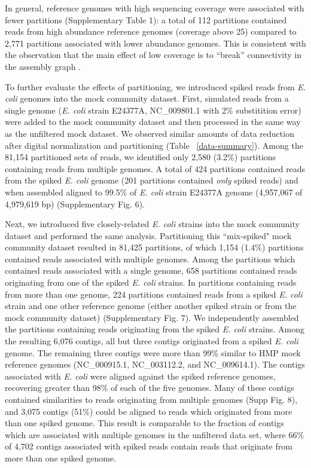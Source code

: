 \documentclass{nature}%
\begin{document}
In general, reference genomes with high sequencing coverage were
associated with fewer partitions (Supplementary Table 1): a
total of 112 partitions contained reads from high abundance reference
genomes (coverage above 25) compared to 2,771 partitions associated
with lower abundance genomes.  This is consistent
with the observation that the main effect of low coverage is to
``break'' connectivity in the assembly graph \cite{Chaisson:2008p1373,Pevzner:2001p1374}.

To further evaluate the effects of partitioning, we introduced spiked reads from
\emph{E. coli} genomes into the mock community
dataset. First, simulated reads from a single genome (\emph{E. coli} strain
E24377A, NC\_009801.1 with 2\% substitition error) were added to the
mock community dataset and then processed in the same way as the
unfiltered mock dataset.  We observed similar amounts of data
reduction after digital normalization and partitioning (Table
~\ref{data-summary}).  Among the 81,154 partitioned sets of reads, we
identified only 2,580 (3.2\%) partitions containing reads from
multiple genomes.  A total of 424 partitions contained reads from the
spiked \emph{E. coli} genome (201 partitions contained \emph{only}
spiked reads) and when assembled aligned to 99.5\% of \emph{E. coli}
strain E24377A genome (4,957,067 of 4,979,619 bp) (Supplementary Fig. 6).

Next, we introduced five closely-related \emph{E. coli} strains into the mock
community dataset and performed the same analysis.
Partitioning this ``mix-spiked" mock community
dataset resulted in 81,425 partitions, of which 1,154 (1.4\%)
partitions contained reads associated with multiple genomes.  Among
the partitions which contained reads associated with a single genome,
658 partitions contained reads originating from one of the spiked
\emph{E. coli} strains.  In partitions containing reads from more than
one genome, 224 partitions contained reads from a spiked
\emph{E. coli} strain and one other reference genome (either another
spiked strain or from the mock community dataset) (Supplementary Fig. 7).  We
independently assembled the partitions containing reads originating
from the spiked \emph{E. coli} strains.  Among the resulting 6,076
contigs, all but three contigs originated from a spiked \emph{E. coli}
genome.  The remaining three contigs were more than 99\% similar to
HMP mock reference genomes (NC\_000915.1, NC\_003112.2, and
NC\_009614.1).  The contigs associated with \emph{E. coli} were
aligned against the spiked reference genomes, recovering greater than
98\% of each of the five genomes.  Many of these contigs contained
similarities to reads originating from multiple genomes (Supp Fig. 8),
and 3,075 contigs (51\%) could be aligned to reads which originated from
more than one spiked genome.  This result is comparable to the
fraction of contigs which are associated with multiple genomes in the
unfiltered data set, where 66\% of 4,702 contigs associated with
spiked reads contain reads that originate from more than one spiked
genome.
\end{document}
